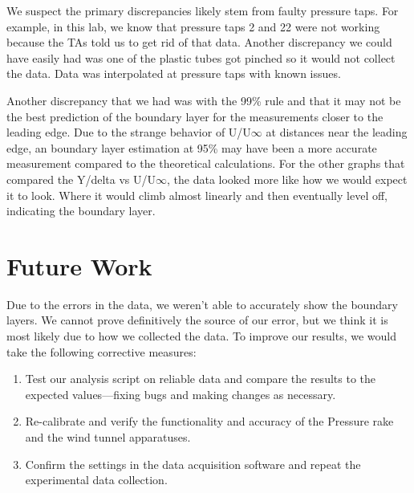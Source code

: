 We suspect the primary discrepancies likely stem from faulty pressure taps. For example, in this lab, we know that pressure taps 2 and 22 were not working because the TAs told us to get rid of that data. Another discrepancy we could have easily had was one of the plastic tubes got pinched so it would not collect the data. Data was interpolated at pressure taps with known issues.

Another discrepancy that we had was with the 99\% rule and that it may not be the best prediction of the boundary layer for the measurements closer to the leading edge. Due to the strange behavior of U/U$\infty$ at distances near the leading edge, an boundary layer estimation at 95\% may have been a more accurate measurement compared to the theoretical calculations. For the other graphs that compared the Y/delta vs U/U$\infty$, the data looked more like how we would expect it to look. Where it would climb almost linearly and then eventually level off, indicating the boundary layer. 

\section{Future Work} \label{sec:FutureWork}

Due to the errors in the data, we weren't able to accurately show the boundary layers. We cannot prove definitively the source of our error, but we think it is most likely due to how we collected the data. To improve our results, we would take the following corrective measures:

\begin{enumerate}
    \item Test our analysis script on reliable data and compare the results to the expected values—fixing bugs and making changes as necessary.
    \item Re-calibrate and verify the functionality and accuracy of the Pressure rake and the wind tunnel apparatuses.
    \item Confirm the settings in the data acquisition software and repeat the experimental data collection.
\end{enumerate}